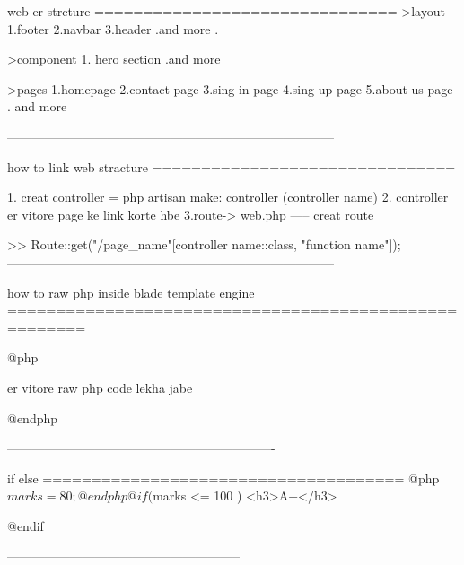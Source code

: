 
web er strcture
===============================
>layout
  1.footer
  2.navbar
  3.header
  .and more
  .

>component
 1. hero section
 .and more

>pages
 1.homepage
 2.contact page
 3.sing in page
 4.sing up page
 5.about us page
 . and more

------------------------------------------------------------------------------

how to link  web stracture
===============================

1. creat controller  =  php artisan make: controller (controller name)
2. controller er vitore page ke link korte hbe
3.route-> web.php ----- creat route

 >> Route::get("/page_name"[controller name::class, "function name"]);
------------------------------------------------------------------------------

 how to raw php inside blade template engine
 ======================================================

@php

 er vitore raw php code lekha jabe

@endphp

----------------------------------------------------------------

if else
=====================================
@php
    $marks = 80;

@endphp

@if ($marks <= 100 )
   <h3>A+</h3>

@endif

--------------------------------------------------------

